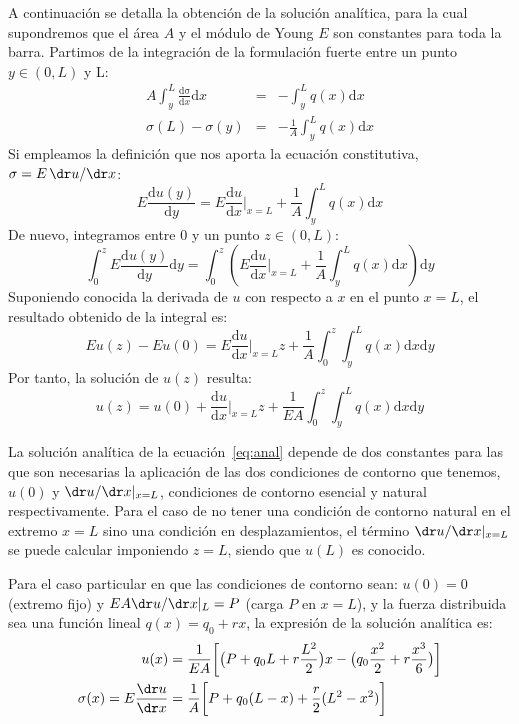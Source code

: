 \documentclass[spanish,a4paper,12pt]{article}
\begin{document}
A continuación se detalla la obtención de la solución analítica, para la cual supondremos que el área $A$ y el módulo de Young $E$ son constantes para toda la barra. Partimos de la integración de la formulación fuerte entre un punto $y\in(0,L)$ y L:
\begin{eqnarray}
A \int_y^L \frac{\mathrm{d \sigma}}{\mathrm{d} x} \mathrm{d} x &=& -\int_y^L  q(x) \mathrm{d} x \\
\sigma(L)-\sigma(y) &=& -\frac{1}{A}\int_y^L  q(x) \mathrm{d} x 
\end{eqnarray}
Si empleamos la definición que nos aporta la ecuación constitutiva, $\sigma = E\, \dr u/\dr x$:
\begin{equation}
E \frac{\mathrm{d} u(y)}{\mathrm{d} y} = E \frac{\mathrm{d} u}{\mathrm{d} x} \biggr\rvert_{x=L}  +\frac{1}{A}\int_y^L  q(x) \mathrm{d} x 
\end{equation}
De nuevo, integramos entre 0 y un punto $z\in(0,L)$:
\begin{equation}
\int_0^z E \frac{\mathrm{d} u(y)}{\mathrm{d} y} \mathrm{d} y = \int_0^z \left( E \frac{\mathrm{d} u}{\mathrm{d} x} \biggr\rvert_{x=L}  +\frac{1}{A}\int_y^L  q(x) \mathrm{d} x \right) \mathrm{d} y
\end{equation}
Suponiendo conocida la derivada de $u$ con respecto a $x$ en el punto $x=L$, el resultado obtenido de la integral es:
\begin{equation}
E u(z) - E u(0) = E \frac{\mathrm{d} u}{\mathrm{d} x} \biggr\rvert_{x=L} z + \frac{1}{A}\int_0^z\int_y^L  q(x) \mathrm{d} x \mathrm{d} y
\end{equation}
Por tanto, la solución de $u(z)$ resulta:
\begin{equation}\label{eq:anal}
u(z)  = u(0) +  \frac{\mathrm{d} u}{\mathrm{d} x} \biggr\rvert_{x=L} z  +\frac{1}{EA}\int_0^z\int_y^L  q(x) \mathrm{d} x \mathrm{d} y
\end{equation}

La solución analítica de la ecuación~\eqref{eq:anal} depende de dos constantes para las que son necesarias la aplicación de las dos condiciones de contorno que tenemos, $u(0) $ y $\dr u / \dr x |_{x=L}$, condiciones de contorno esencial y natural respectivamente. Para el caso de no tener una condición de contorno natural en el extremo $x=L$ sino una condición en desplazamientos, el término $\dr u / \dr x |_{x=L}$ se puede calcular imponiendo $z=L$, siendo que $u(L)$ es conocido.

Para el caso particular en que las condiciones de contorno sean: $u(0)=0$ (extremo fijo) y $EA\dr u/\dr x|_{L}=P$ (carga $P$ en $x=L$), y la fuerza distribuida sea una función lineal $q(x)=q_{0}+rx$, la expresión de la solución analítica es:
\begin{equation}
\begin{split}
	u(x) &= \frac{1}{EA}\bigg[ 
	\big(P+q_{0}L+r\frac{L^{2}}{2}\big)x - \big(q_{0}\frac{x^{2}}{2}+r\frac{x^{3}}{6}\big) \bigg]
	\\
	\sigma(x) = E\frac{\dr u}{\dr x}
	&=  \frac{1}{A}\bigg[ 
	P+q_{0}(L-x)+\frac{r}{2}(L^{2}-x^{2}) \bigg]
\end{split}
\label{eq:analitica}
\end{equation}
\end{document}
